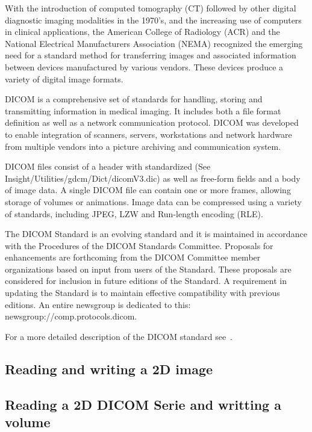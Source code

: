 With the introduction of computed tomography (CT) followed by other digital diagnostic imaging
modalities in the 1970's, and the increasing use of computers in clinical applications, the American
College of Radiology (ACR) and the National Electrical Manufacturers Association (NEMA) recognized
the emerging need for a standard method for transferring images and associated information between
devices manufactured by various vendors. These devices produce a variety of digital image formats.

DICOM is a comprehensive set of standards for handling, storing and transmitting information in medical
imaging. It includes both a file format definition as well as a network communication protocol.
DICOM was developed to enable integration of scanners, servers, workstations and network hardware from
multiple vendors into a picture archiving and communication system.

DICOM files consist of a header with standardized (See Insight/Utilities/gdcm/Dict/dicomV3.dic) as well 
as free-form fields and a body of image data. A single DICOM file can contain one or more frames, 
allowing storage of volumes or animations. Image data can be compressed using a variety of standards,
including JPEG, LZW and Run-length encoding (RLE).

The DICOM Standard is an evolving standard and it is maintained in accordance with the Procedures of
the DICOM Standards Committee. Proposals for enhancements are forthcoming from the DICOM
Committee member organizations based on input from users of the Standard. These proposals are
considered for inclusion in future editions of the Standard. A requirement in updating the Standard is to
maintain effective compatibility with previous editions. An entire newsgroup is dedicated to this: 
newsgroup://comp.protocols.dicom.

For a more detailed description of the DICOM standard see~\cite{DICOMStandard}.

\subsection{Reading and writing a 2D image}


\subsection{Reading a 2D DICOM Serie and writting a volume}


